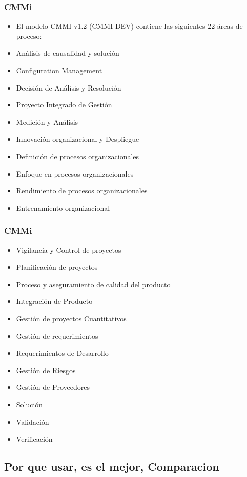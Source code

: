 \documentclass{beamer}
\begin{document}
\frame
{
  \frametitle{CMMi}
  	\begin{itemize}
\item<1-> El modelo CMMI v1.2 (CMMI-DEV) contiene las siguientes 22 áreas de proceso:
\item<1-> Análisis de causalidad y solución
\item<1-> Configuration Management
\item<1-> Decisión de Análisis y Resolución
\item<1-> Proyecto Integrado de Gestión
\item<1-> Medición y Análisis
\item<1-> Innovación organizacional y Despliegue
\item<1-> Definición de procesos organizacionales
\item<1-> Enfoque en procesos organizacionales
\item<1-> Rendimiento de procesos organizacionales
\item<1-> Entrenamiento organizacional

  	\end{itemize}
}

\frame
{
  \frametitle{CMMi}
  	\begin{itemize}
  	
\item<1-> Vigilancia y Control de proyectos
\item<1-> Planificación de proyectos
\item<1-> Proceso y aseguramiento de calidad del producto
\item<1-> Integración de Producto
\item<1-> Gestión de proyectos Cuantitativos
\item<1-> Gestión de requerimientos
\item<1-> Requerimientos de Desarrollo
\item<1-> Gestión de Riesgos
\item<1-> Gestión de Proveedores
\item<1-> Solución
\item<1-> Validación
\item<1-> Verificación
  	\end{itemize}
}

\subsection{Por que usar, es el mejor, Comparacion}
\end{document}
